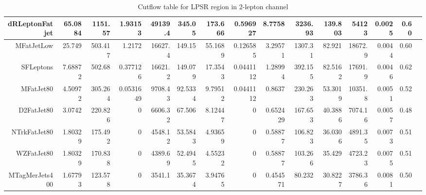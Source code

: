 \begin{table}[ht!]
\begin{center}
{\begin{tabular}{ r ||  r  r  r  r  r  r  r  r  r  || r r r r r |}
dRLeptonFatjet & 65.0884 & 1151.57 & 1.93153 & 49139.4 & 345.05 & 173.666 & 0.596927 & 8.7758 & 3236.93  & 139.803&54123&0.0025 & 0.60\tabularnewline \hline
MFatJetLow & 25.749 & 503.417 & 1.2172 & 16627.4 & 149.15 & 55.1689 & 0.126585 & 3.29571 & 1307.31 & 82.921 &18672.9&0.0044 & 0.60\tabularnewline \hline
SFLeptons & 7.68872 & 502.68 & 0.377126 & 16621.2 & 149.079 & 17.3543 & 0.0441112 & 1.28994 & 392.155 & 82.5162 &17691.9&0.0046 & 0.62\tabularnewline \hline
MFatJet80 & 4.50972 & 305.264 & 0.0531649 & 9708.43 & 92.5334 & 9.79512 & 0.0441112 & 0.8637 & 230.263 & 53.3019 &10351.8&0.0051& 0.52\tabularnewline \hline
D2FatJet80 & 3.0742 & 220.826 & 0 & 6606.32 & 67.506 & 8.12447 & 0 & 0.652429 & 167.653 & 40.3886 &7074.16&0.0057 & 0.48\tabularnewline \hline
NTrkFatJet80 & 1.80329 & 175.492 & 0 & 4548.12 & 53.5843 & 4.93659 & 0 & 0.58877 & 106.823 & 36.0306 &4891.35&0.0073 & 0.51\tabularnewline \hline
WZFatJet80 & 1.80329 & 170.838 & 0 & 4389.69 & 52.4945 & 4.55232 & 0 & 0.58877 & 103.266 & 35.429 &4723.23&0.0075 & 0.51\tabularnewline \hline
MTagMerJets400 & 1.67793 & 123.578 & 0 & 3541.1 & 35.3674 & 3.94765 & 0 & 0.454571 & 80.232 & 30.8227 &3786.36&0.0081 & 0.50\tabularnewline \hline
\end{tabular}
}
\caption{Cutflow table for LPSR region in 2-lepton channel}
\label{tab:2lep_LPSR}
\end{center}
\end{table}

